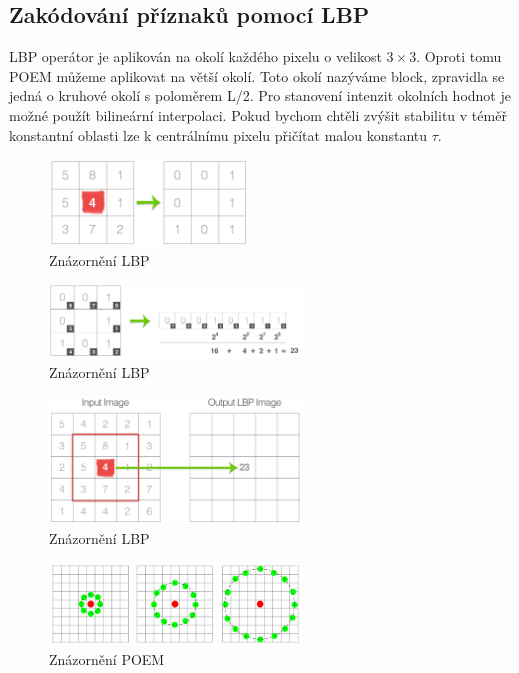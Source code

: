 \documentclass{report}
\begin{document}
\subsection{Zakódování příznaků pomocí LBP}
LBP operátor je aplikován na okolí každého pixelu o velikost $3 \times 3$. Oproti tomu POEM můžeme aplikovat na větší okolí. Toto okolí nazýváme block, zpravidla se jedná o kruhové okolí s poloměrem L/2. Pro stanovení intenzit okolních hodnot je možné použít bilineární interpolaci. Pokud bychom chtěli zvýšit stabilitu v téměř konstantní oblasti lze k centrálnímu pixelu přičítat malou konstantu $\tau$.

\begin{figure}[H]
		\centering
		\includegraphics[width=200px]{./img/lbp_thresholding.jpg}	
		\caption{Znázornění LBP}
\end{figure} 

\begin{figure}[H]
		\centering
		\includegraphics[width=253px]{./img/lbp_calculation.jpg}	
		\caption{Znázornění LBP}
\end{figure} 

\begin{figure}[H]
		\centering
		\includegraphics[width=253px]{./img/lbp_to_output.jpg}	
		\caption{Znázornění LBP}
\end{figure} 
 
\begin{figure}[H]
		\centering
		\includegraphics[width=253px]{./img/poem.png}	
		\caption{Znázornění POEM}
\end{figure}
\end{document}
